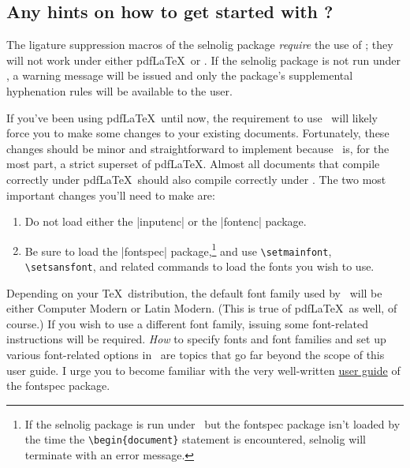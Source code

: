 \documentclass[11pt]{article}
\newcommand{\pkg}[1]{\textsf{#1}}
\newcommand{\cmmd}[1]{\texttt{\textbackslash #1}}
\begin{document}
\subsection{Any hints on how to get started with \LuaLaTeX?}

\begingroup
\renewcommand\theenumi{(\roman{enumi})}
\renewcommand\labelenumi\theenumi


The ligature suppression macros of the \pkg{selnolig} package \emph{require} the use of \LuaLaTeX; they will not work under either pdf\LaTeX\ or \XeLaTeX. If the \pkg{selnolig} package is not run under \LuaLaTeX, a warning message will be issued and only the package's supplemental hyphenation rules will be available to the user.

If you've been using pdf\LaTeX\ until now, the requirement to use \LuaLaTeX\ will likely force you to make some changes to your existing documents. Fortunately, these changes should be minor and straightforward to implement because \LuaLaTeX\ is, for the most part, a strict superset of pdf\LaTeX. Almost all documents that compile correctly under pdf\LaTeX\ should also compile correctly under \LuaLaTeX. 
The two most important changes you'll need to make are: 
\begin{enumerate}
\item Do not load either the |inputenc| or the |fontenc| package. 
\item Be sure to load the |fontspec| package,\footnote{If the \pkg{selnolig} package is run under \LuaLaTeX\ but the \pkg{fontspec} package isn't loaded by the time the \Verb+\begin{document}+ statement is encountered, \pkg{selnolig} will terminate with an error message.} and use \cmmd{setmainfont}, \cmmd{setsansfont}, and related commands to load the fonts you wish to use.
\end{enumerate}
\endgroup


Depending on your \TeX\ distribution, the default font family used by \LuaLaTeX\ will be either Computer Modern or Latin Modern. (This is true of pdf\LaTeX\ as well, of course.) If you wish to use a different font family, issuing some font-related instructions will be required. \emph{How} to specify fonts and font families and set up various font-related options in \LuaLaTeX\ are topics that go far beyond the scope of this user guide. I urge you to become familiar with the very well-written
 \href{http://www.ctan.org/tex-archive/macros/latex/contrib/fontspec/fontspec.pdf}{user guide} of the \pkg{fontspec} package.
\end{document}
